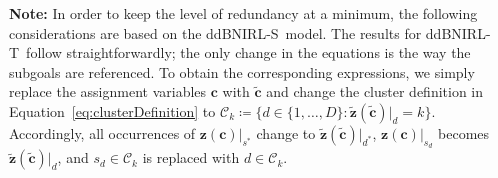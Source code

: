 \documentclass[twoside,11pt]{article}
\newcommand{\defeq}{\coloneqq}
\newcommand{\ddBNIRLS}{\mbox{ddBNIRL-S}}
\newcommand{\ddBNIRLT}{\mbox{ddBNIRL-T}}
\begin{document}
\vspace{0.5\baselineskip}
\noindent
\textbf{Note:} In order to keep the level of redundancy at a minimum, the following considerations are based on the %
\ddBNIRLS\  model. The %
results for \ddBNIRLT\  follow straightforwardly; the only %
change in the equations is the way the subgoals are referenced. To obtain the corresponding expressions, we simply replace the assignment variables $\mathbf{c}$ with $\mathbf{\tilde{c}}$ and change the cluster definition in Equation~\eqref{eq:clusterDefinition} to $\mathcal{C}_k\defeq\{d\in\{1,\ldots,D\}:\mathbf{\tilde{z}}(\mathbf{\tilde{c}})|_d=k\}$. Accordingly, all occurrences of $\mathbf{z}(\mathbf{c})\vert_{s^*}$ change to $\mathbf{\tilde{z}}(\mathbf{\tilde{c}})\vert_{d^*}$, $\mathbf{z}(\mathbf{c})\vert_{s_d}$ becomes $\mathbf{\tilde{z}}(\mathbf{\tilde{c}})\vert_{d}$, and $s_d\in\mathcal{C}_k$ is replaced with $d\in\mathcal{C}_k$.
\end{document}
